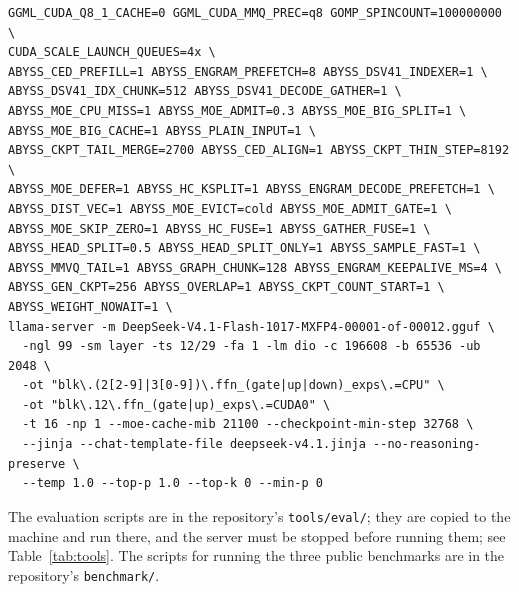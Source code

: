 \documentclass[11pt,a4paper]{article}
\newcommand{\code}[1]{\texttt{#1}}
\begin{document}
\begin{small}
\begin{verbatim}
GGML_CUDA_Q8_1_CACHE=0 GGML_CUDA_MMQ_PREC=q8 GOMP_SPINCOUNT=100000000 \
CUDA_SCALE_LAUNCH_QUEUES=4x \
ABYSS_CED_PREFILL=1 ABYSS_ENGRAM_PREFETCH=8 ABYSS_DSV41_INDEXER=1 \
ABYSS_DSV41_IDX_CHUNK=512 ABYSS_DSV41_DECODE_GATHER=1 \
ABYSS_MOE_CPU_MISS=1 ABYSS_MOE_ADMIT=0.3 ABYSS_MOE_BIG_SPLIT=1 \
ABYSS_MOE_BIG_CACHE=1 ABYSS_PLAIN_INPUT=1 \
ABYSS_CKPT_TAIL_MERGE=2700 ABYSS_CED_ALIGN=1 ABYSS_CKPT_THIN_STEP=8192 \
ABYSS_MOE_DEFER=1 ABYSS_HC_KSPLIT=1 ABYSS_ENGRAM_DECODE_PREFETCH=1 \
ABYSS_DIST_VEC=1 ABYSS_MOE_EVICT=cold ABYSS_MOE_ADMIT_GATE=1 \
ABYSS_MOE_SKIP_ZERO=1 ABYSS_HC_FUSE=1 ABYSS_GATHER_FUSE=1 \
ABYSS_HEAD_SPLIT=0.5 ABYSS_HEAD_SPLIT_ONLY=1 ABYSS_SAMPLE_FAST=1 \
ABYSS_MMVQ_TAIL=1 ABYSS_GRAPH_CHUNK=128 ABYSS_ENGRAM_KEEPALIVE_MS=4 \
ABYSS_GEN_CKPT=256 ABYSS_OVERLAP=1 ABYSS_CKPT_COUNT_START=1 \
ABYSS_WEIGHT_NOWAIT=1 \
llama-server -m DeepSeek-V4.1-Flash-1017-MXFP4-00001-of-00012.gguf \
  -ngl 99 -sm layer -ts 12/29 -fa 1 -lm dio -c 196608 -b 65536 -ub 2048 \
  -ot "blk\.(2[2-9]|3[0-9])\.ffn_(gate|up|down)_exps\.=CPU" \
  -ot "blk\.12\.ffn_(gate|up)_exps\.=CUDA0" \
  -t 16 -np 1 --moe-cache-mib 21100 --checkpoint-min-step 32768 \
  --jinja --chat-template-file deepseek-v4.1.jinja --no-reasoning-preserve \
  --temp 1.0 --top-p 1.0 --top-k 0 --min-p 0
\end{verbatim}
\end{small}

The evaluation scripts are in the repository's \code{tools/eval/}; they are copied to the machine and run there, and the server must be stopped before running them; see Table~\ref{tab:tools}. The scripts for running the three public benchmarks are in the repository's \code{benchmark/}.
\end{document}
